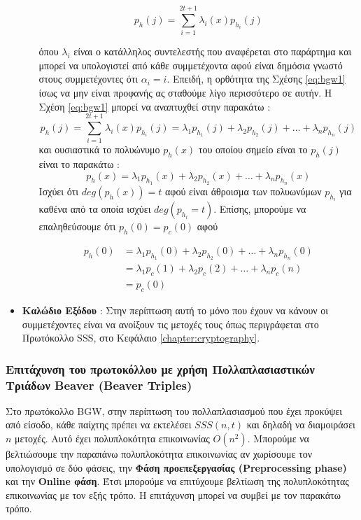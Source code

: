 \begin{itemize}
\begin{itemize}
            
            \begin{equation}\label{eq:bgw1}
            p_h(j) = \sum_{i=1}^{2t+1}λ_i(x)p_{h_i}(j)
            \end{equation}
            
            όπου $λ_i$ είναι ο κατάλληλος συντελεστής που αναφέρεται στο παράρτημα και μπορεί να υπολογιστεί από κάθε συμμετέχοντα αφού είναι δημόσια γνωστό στους συμμετέχοντες ότι $α_i=i$. Επειδή, η ορθότητα της Σχέσης \ref{eq:bgw1} ίσως να μην είναι προφανής ας σταθούμε λίγο περισσότερο σε αυτήν. Η Σχέση \ref{eq:bgw1} μπορεί να αναπτυχθεί στην παρακάτω :
            \[
                 p_h(j) = \sum_{i=1}^{2t+1}λ_i(x)p_{h_i}(j) = λ_1p_{h_1}(j) + λ_2p_{h_2}(j) + \ldots + λ_n p_{h_n}(j)
            \]
            και ουσιαστικά το πολυώνυμο $p_h(x)$ του οποίου σημείο είναι το $p_h(j)$ είναι το παρακάτω : 
            \[
                p_h(x) = λ_1p_{h_1}(x) + λ_2p_{h_2}(x) + \ldots + λ_n p_{h_n}(x)
            \]
            Ισχύει ότι $deg(p_h(x))=t$ αφού είναι άθροισμα των πολυωνύμων $p_{h_i}$ για καθένα από τα οποία ισχύει $deg(p_{h_i} = t)$. Επίσης, μπορούμε να επαληθεύσουμε ότι $p_h(0)=p_c(0)$ αφού
            
            \begin{align}
                p_h(0) &= λ_1 p_{h_1}(0) + λ_2 p_{h_2}(0) + \ldots + λ_n p_{h_n}(0) \\
                &= λ_1 p_c(1) + λ_2 p_c(2) + \ldots + λ_n p_c(n) \\
                &= p_c(0)
            \end{align}
        \end{itemize}
    \item \textbf{Καλώδιο Εξόδου} : Στην περίπτωση αυτή το μόνο που έχουν να κάνουν οι συμμετέχοντες είναι να ανοίξουν τις μετοχές τους όπως περιγράφεται στο Πρωτόκολλο SSS, στο Κεφάλαιο \ref{chapter:cryptography}.
\end{itemize}

\subsubsection{Επιτάχυνση του πρωτοκόλλου με χρήση Πολλαπλασιαστικών Τριάδων Beaver (Beaver Triples)}
Στο πρωτόκολλο BGW, στην περίπτωση του πολλαπλασιασμού που έχει προκύψει από είσοδο, κάθε παίχτης πρέπει να εκτελέσει $SSS(n,t)$ και δηλαδή να διαμοιράσει $n$ μετοχές. Αυτό έχει πολυπλοκότητα επικοινωνίας $O(n^2)$. Μπορούμε να βελτιώσουμε την παραπάνω πολυπλοκότητα επικοινωνίας αν χωρίσουμε τον υπολογισμό σε δύο φάσεις, την \textbf{Φάση προεπεξεργασίας (Preprocessing phase)} και την \textbf{Online φάση}. Έτσι μπορούμε να επιτύχουμε βελτίωση της πολυπλοκότητας επικοινωνίας με τον εξής τρόπο. Η επιτάχυνση μπορεί να συμβεί με τον παρακάτω τρόπο.


